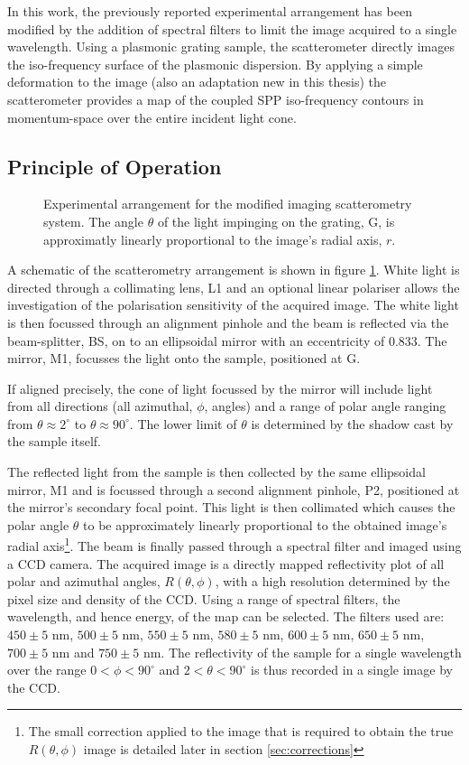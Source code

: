 In this work, the previously reported experimental arrangement \cite{Stavenga2009a} has been modified by the addition of spectral filters to limit the image acquired to a single wavelength. Using a plasmonic grating sample, the scatterometer directly images the iso-frequency surface of the plasmonic dispersion. By applying a simple deformation to the image (also an adaptation new in this thesis) the scatterometer provides a map of the coupled SPP iso-frequency contours in momentum-space over the entire incident light cone. 
\subsection{Principle of Operation}
\begin{figure}
\centering 
\caption[Experimental arrangement for the modified imaging scatterometry system.]{Experimental arrangement for the modified imaging scatterometry system. The angle $\theta$ of the light impinging on the grating, G, is approximatly linearly proportional to the image's radial axis, $r$. \label{fig:scatterometry}}
\end{figure}
A schematic of the scatterometry arrangement is shown in figure \ref{fig:scatterometry}. White light is directed through a collimating lens, L1 and an optional linear polariser allows the investigation of the polarisation sensitivity of the acquired image.  The white light is then focussed through an alignment pinhole and the beam is reflected via the beam-splitter, BS, on to an ellipsoidal mirror with an eccentricity of 0.833. The mirror, M1, focusses the light onto the sample, positioned at G. 

If aligned precisely, the cone of light focussed by the mirror will include light from all directions (all azimuthal, $\phi$, angles) and a range of polar angle ranging from $\theta \approx 2^\circ$ to $\theta \approx 90^\circ$. The lower limit of $\theta$ is determined by the shadow cast by the sample itself. 

The reflected light from the sample is then collected by the same ellipsoidal mirror, M1 and is focussed through a second alignment pinhole, P2, positioned at the mirror's secondary focal point. This light is then collimated which causes the polar angle $\theta$ to be approximately linearly proportional to the obtained image's radial axis\footnote{The small correction applied to the image that is required to obtain the true $R(\theta,\phi)$ image is detailed later in section \ref{sec:corrections}}. The beam is finally passed through a spectral filter and imaged using a CCD camera. The acquired image is a directly mapped reflectivity plot of all polar and azimuthal angles, $R(\theta,\phi)$, with a high resolution determined by the pixel size and density of the CCD.
Using a range of spectral filters, the wavelength, and hence energy, of the map can be selected. The filters used are: $450\pm5$ nm, $500\pm5$ nm, $550\pm5$ nm, $580\pm5$ nm, $600\pm5$ nm, $650\pm5$ nm,  $700\pm5$ nm and $750\pm5$ nm. The reflectivity of the sample for a single wavelength over the range $0< \phi < 90^\circ$ and $2< \theta < 90^\circ$ is thus recorded in a single image by the CCD. 

